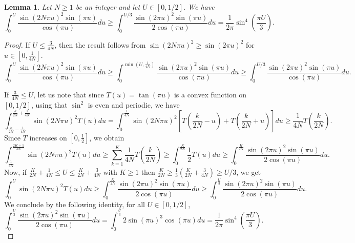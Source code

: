 \documentclass[12pt]{amsart}
\newtheorem{lem}[thm]{Lemma}
\theoremstyle{definition}
\numberwithin{equation}{section}
\numberwithin{equation}{section}
\begin{document}
\begin{lem}Let \(N\geq1\) be an integer and let \(U\in[0,1/2]\). We have
    \[\int_{0}^U \frac{\sin(2N\pi u)^2\sin(\pi u)}{\cos(\pi u)}du
    \geq
    \int_{0}^{U/3} 
   \frac{\sin(2\pi u)^2\sin(\pi u)}{2\cos(\pi u)}du
    = \frac{1}{2\pi}\sin^4\left(\frac{\pi U}{3}\right).\]
\end{lem}
\begin{proof}
    If $U\leq \frac{3}{4N}$, then the result follows from $\sin(2N\pi u)^2\geq \sin(2\pi u)^2 $ for $u \in 
    [0,\frac{1}{4N} ] $. 
    \[
    \int_{0}^U \frac{\sin(2N\pi u)^2\sin(\pi u)}{\cos(\pi u)}du\geq 
    \int_{0}^{\min\left(U,\frac{1}{4N}\right)} \frac{\sin(2\pi u)^2\sin(\pi u)}{\cos(\pi u)}du
    \geq\int_{0}^{U/3} 
    \frac{\sin(2\pi u)^2\sin(\pi u)}{\cos(\pi u)} du.
    \]

    If $\frac{3}{4N}\leq U$, let us note that since $T(u) = \tan(\pi u)$ is a convex function on $[0,1/2]$, using that \(\sin^2\) is even and periodic, we have 
    \[
    \int_{\frac{k}{2N}-\frac{1}{4N}}^{\frac{k}{2N}+\frac{1}{4N}}  \sin(2N\pi u)^2 T(u)du = 
    \int_{0}^{\frac{1}{4N}}\sin(2N\pi u)^2 \left[
    T\left(\frac{k}{2N} -u\right)+
    T\left(\frac{k}{2N} +u \right)\right] du \geq \frac{1}{4N}T\left(\frac{k}{2N}\right). 
    \] 
    Since $T $ increases on $\left[0,\frac{1}{2}\right]$, we obtain
    \[
    \int_{\frac{1}{4N}}^{\frac{2K+1}{4N}} \sin(2N\pi u)^2 T(u)du
    \geq
    \sum_{k=1}^{K}\frac{1}{4N}T\left(\frac{k}{2N}\right)
    \geq
    \int_{0}^{\frac{K}{2N}}\frac{1}{2}T\left(u\right)du
    \geq \int_{0}^{\frac{K}{2N}}
    \frac{\sin(2\pi u)^2\sin(\pi u)}{2\cos(\pi u)}du.
    \]
    Now, if $\frac{K}{2N}+\frac{1}{4N}\leq U \leq  \frac{K}{2N}+\frac{3}{4N}$ with $K\geq 1$ then $\frac{K}{2N}\geq  \frac{1}{3}\left(\frac{K}{2N}+\frac{3}{4N}\right)\geq U/3$, we get
    \[
    \int_{0}^{U} \sin(2N\pi u)^2 T(u)du
    \geq
    \int_{0}^{\frac{K}{2N}}
    \frac{\sin(2\pi u)^2\sin(\pi u)}{2\cos(\pi u)}du
    \geq
    \int_{0}^{\frac{U}{3}}
    \frac{\sin(2\pi u)^2\sin(\pi u)}{2\cos(\pi u)}du.
    \]
    We conclude by the following identity, for all $U\in[0,1/2]$, 
    \[\int_{0}^{\frac{U}{3}}
    \frac{\sin(2\pi u)^2\sin(\pi u)}{2\cos(\pi u)}du = 
    \int_{0}^{\frac{U}{3}}
    2\sin(\pi u)^3\cos(\pi u)du
     = \frac{1}{2\pi} \sin^4\left(\frac{\pi U}{3}\right).
    \]
\end{proof}
\end{document}
